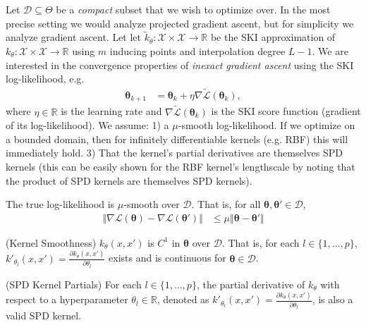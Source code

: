 Let $\mathcal{D}\subseteq \Theta$ be a \textit{compact} subset that we wish to optimize over. In the most precise setting we would analyze projected gradient ascent, but for simplicity we analyze gradient ascent. Let let $\tilde{k}_{\theta}: \mathcal{X} \times \mathcal{X} \rightarrow \mathbb{R}$ be the SKI approximation of $k_{\theta}: \mathcal{X} \times \mathcal{X} \rightarrow \mathbb{R}$ using $m$ inducing points and interpolation degree $L-1$. We are interested in the convergence properties of \textit{inexact gradient ascent} using the SKI log-likelihood, e.g.
\begin{align*}
    \boldsymbol{\theta}_{k+1}&=\boldsymbol{\theta}_k+\eta \nabla \tilde{\mathcal{L}}(\boldsymbol{\theta}_k),
\end{align*}
where $\eta\in \mathbb{R}$ is the learning rate and $\nabla \tilde{\mathcal{L}}(\boldsymbol{\theta}_k)$ is the SKI score function (gradient of its log-likelihood). We assume: 1) a $\mu$-smooth log-likelihood. If we optimize on a bounded domain, then for infinitely differentiable kernels (e.g. RBF) this will immediately hold. 3) That the kernel's partial derivatives are themselves SPD kernels (this can be easily shown for the RBF kernel's lengthscale by noting that the product of SPD kernels are themselves SPD kernels). 
\begin{assumption}\label{assumption:mu-smoothness}
The true log-likelihood is $\mu$-smooth over $\mathcal{D}$. That is, for all $\boldsymbol{\theta},\boldsymbol{\theta}'\in \mathcal{D}$,
\begin{align*}
    \Vert \nabla \mathcal{L}(\boldsymbol{\theta})-\nabla \mathcal{L}(\boldsymbol{\theta}')\Vert &\leq \mu \Vert \boldsymbol{\theta}-\boldsymbol{\theta}'\Vert
\end{align*}
\end{assumption}

\begin{assumption}
    (Kernel Smoothness) $k_\theta(x,x')$ is $C^1$ in $\boldsymbol{\theta}$ over $\mathcal{D}$. That is, for each $l \in \{1, ..., p\}$, $k'_{\theta_l}(x, x') = \frac{\partial k_{\theta}(x, x')}{\partial \theta_l}$ exists and is continuous for $\boldsymbol{\theta}\in \mathcal{D}$.
\end{assumption}
\begin{assumption}
    (SPD Kernel Partials) For each $l \in \{1, ..., p\}$, the partial derivative of $k_{\theta}$ with respect to a hyperparameter $\theta_l\in \mathbb{R}$, denoted as $k'_{\theta_l}(x, x') = \frac{\partial k_{\theta}(x, x')}{\partial \theta_l}$, is also a valid SPD kernel.
\end{assumption}

